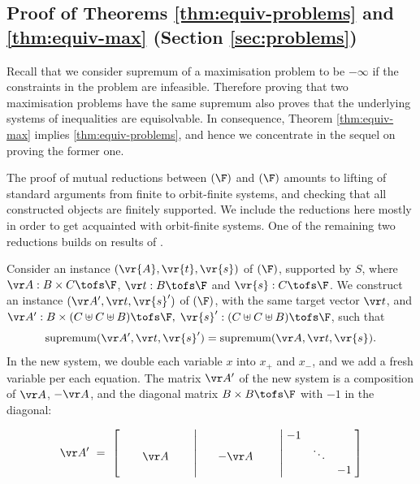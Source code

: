 \subsection{Proof of Theorems \ref{thm:equiv-problems} and \ref{thm:equiv-max} 
(Section \ref{sec:problems})}
\label{sec:problems-proofs-one}

%
Recall that we consider supremum of a maximisation problem to be $-\infty$ if the constraints in the problem are infeasible.
Therefore proving that two maximisation problems have the same supremum also proves that the underlying systems of inequalities are equisolvable.
In consequence, Theorem \ref{thm:equiv-max} implies \ref{thm:equiv-problems}, and hence
we concentrate
in the sequel on proving the former one.


The proof of mutual
reductions between \ineqmaxname$(\F)$ and \nonnegmaxname$(\F)$
amounts to lifting of standard arguments from finite to orbit-finite systems, 
and checking that all constructed objects are finitely supported. 
We include the reductions here mostly in order to get acquainted with orbit-finite systems.
One of the remaining two reductions builds on results of \cite{GHL22}.
%

%
Consider an instance $(\vr{A},\vr{t},\vr{s})$ of \ineqmaxname$(\F)$, supported by $S$,
where $\vr A : B \times C \tofs \F$, $\vr t : B\tofs \F$ and $\vr{s} : C\tofs \F$.
We construct an instance $(\vr A', \vr t, \vr{s}')$ of \nonnegmaxname$(\F)$,
with the same target vector $\vr t$, and
$
\vr A' : B \times (C \uplus C \uplus B) \tofs \F,
$
$\vr{s}' : (C \uplus C \uplus B) \tofs \F$,
such that
\begin{align*} %
\textnormal{supremum}(\vr A', \vr t, \vr{s}')
=
\textnormal{supremum}(\vr A, \vr t, \vr{s}).
\end{align*}
In the new system, we double each variable $x$ into $x_+$ and $x_-$, and we add a fresh variable per each equation.
The matrix $\vr A'$ of the new system is a composition of $\vr A$, $-\vr A$, and the diagonal matrix 
$B \times B\tofs \F$ with $-1$ in the diagonal:

\vspace{-2mm}
\begin{align*}
\vr A' \ = \ 
\left[
\begin{matrix}
  & &  \phantom{1} \\  & \ \ \ \vr A & \phantom{\ddots}    \\     &  &    \phantom{1}
\end{matrix}
\right\rvert
\begin{matrix}
  & &   \\  & \ \ - \vr A &  \phantom{\ddots}  \\     &  &   
\end{matrix}
\left\rvert
\begin{matrix}
\; -1 & &   \\  & \ddots &    \\     &  & -1 \;  
\end{matrix}
\right]
\end{align*}
%

